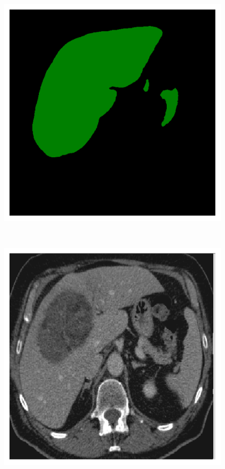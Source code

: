 {\begin{figure}[!ht]
\begin{mdframed}[backgroundcolor=blue!50,linecolor=blue!50]
\begin{minipage}{4cm}
	\end{minipage} \hspace{-0.3cm}
	\begin{minipage}{4cm}
		\includegraphics[width=\linewidth]{images/LiverVE_Pred_Pat1_12}
	\end{minipage} \\
	\begin{minipage}{4cm}
		\includegraphics[width=\linewidth]{images/LiverVE_Raw_Pat6_6}

\end{minipage}
\end{mdframed}
\end{figure}}
